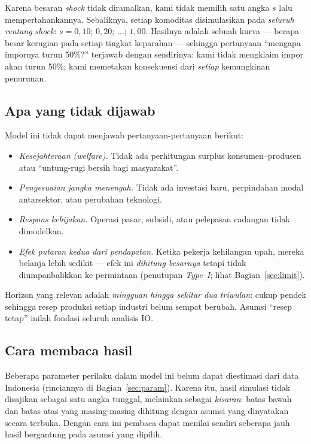 \documentclass[11pt,a4paper]{article}
\newcommand{\en}[1]{\textit{#1}}   %
\begin{document}
Karena besaran \en{shock} tidak diramalkan, kami tidak memilih satu angka
$s$ lalu mempertahankannya. Sebaliknya, setiap komoditas disimulasikan pada
\emph{seluruh rentang} \en{shock}: $s = 0{,}10;\, 0{,}20;\, \ldots;\, 1{,}00$.
Hasilnya adalah sebuah kurva --- berapa besar kerugian pada setiap tingkat
keparahan --- sehingga pertanyaan ``mengapa impornya turun 50\%?'' terjawab
dengan sendirinya: kami tidak mengklaim impor akan turun 50\%; kami
memetakan konsekuensi dari \emph{setiap} kemungkinan penurunan.

\subsection{Apa yang tidak dijawab}

Model ini tidak dapat menjawab pertanyaan-pertanyaan berikut:
\begin{itemize}[nosep]
\item \emph{Kesejahteraan (welfare).} Tidak ada perhitungan surplus
      konsumen--produsen atau ``untung-rugi bersih bagi masyarakat''.
\item \emph{Penyesuaian jangka menengah.} Tidak ada investasi baru,
      perpindahan modal antarsektor, atau perubahan teknologi.
\item \emph{Respons kebijakan.} Operasi pasar, subsidi, atau pelepasan
      cadangan tidak dimodelkan.
\item \emph{Efek putaran kedua dari pendapatan.} Ketika pekerja kehilangan
      upah, mereka belanja lebih sedikit --- efek ini \emph{dihitung
      besarnya} tetapi tidak diumpanbalikkan ke permintaan (penutupan
      \en{Type~I}; lihat Bagian~\ref{sec:limit}).
\end{itemize}
Horizon yang relevan adalah \emph{mingguan hingga sekitar dua triwulan}:
cukup pendek sehingga resep produksi setiap industri belum sempat berubah.
Asumsi ``resep tetap'' inilah fondasi seluruh analisis IO.

\subsection{Cara membaca hasil}

Beberapa parameter perilaku dalam model ini belum dapat diestimasi dari
data Indonesia (rinciannya di Bagian~\ref{sec:param}). Karena itu, hasil
simulasi tidak disajikan sebagai satu angka tunggal, melainkan sebagai
\emph{kisaran}: batas bawah dan batas atas yang masing-masing dihitung
dengan asumsi yang dinyatakan secara terbuka. Dengan cara ini pembaca
dapat menilai sendiri seberapa jauh hasil bergantung pada asumsi yang
dipilih.
\end{document}
